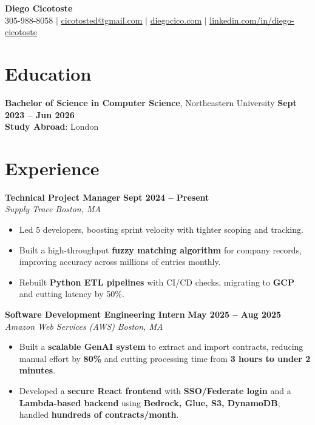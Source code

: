 \documentclass[8pt]{resume}
\begin{document}
\begin{center}
    \textbf{\Huge Diego Cicotoste} \\[1pt]
    \small
    305-988-8058 $|$
    \href{mailto:cicotosted@gmail.com}{\underline{cicotosted@gmail.com}} $|$
    \href{https://www.diegocico.com}{\underline{diegocico.com}} $|$
    \href{https://linkedin.com/in/diego-cicotoste}{\underline{linkedin.com/in/diego-cicotoste}}
\end{center}

\section{Education}
\textbf{Bachelor of Science in Computer Science}, Northeastern University
\hfill \textbf{Sept 2023 – Jun 2026}\\
\textbf{Study Abroad}: London

\section{Experience}

\textbf{Technical Project Manager} \hfill \textbf{Sept 2024 – Present}\\
\textit{Supply Trace} \hfill \textit{Boston, MA}
\begin{itemize}
    \item Led 5 developers, boosting sprint velocity with tighter scoping and tracking.  
    \item Built a high-throughput \textbf{fuzzy matching algorithm} for company records, improving accuracy across millions of entries monthly.  
    \item Rebuilt \textbf{Python ETL pipelines} with CI/CD checks, migrating to \textbf{GCP} and cutting latency by 50\%.      
\end{itemize}

\textbf{Software Development Engineering Intern} \hfill \textbf{May 2025 – Aug 2025}\\
\textit{Amazon Web Services (AWS)} \hfill \textit{Boston, MA}
\begin{itemize}
    \item Built a \textbf{scalable GenAI system} to extract and import contracts, reducing manual effort by \textbf{80\%} and cutting processing time from \textbf{3 hours to under 2 minutes}.
    \item Developed a \textbf{secure React frontend} with \textbf{SSO/Federate login} and a \textbf{Lambda-based backend} using \textbf{Bedrock, Glue, S3, DynamoDB}; handled \textbf{hundreds of contracts/month}.
\end{itemize}
\end{document}
